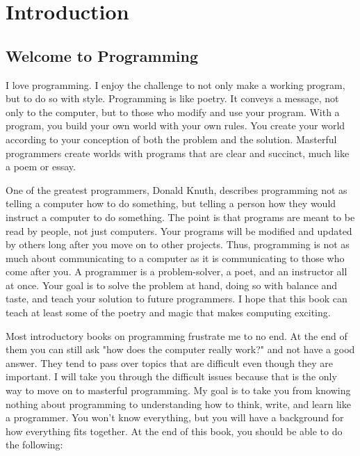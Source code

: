 \chapter{Introduction}

% 
% 
% 
% 

\section{Welcome to Programming}

I love
programming.  I
enjoy the challenge to not only make a working program, but to do so
with style.  Programming is like poetry.  It conveys a message, not
only to the computer, but to those who modify and use your program.
With a program, you build your own world with your own rules.  You
create your world according to your conception of both the problem and
the solution.  Masterful programmers create worlds with programs that
are clear and succinct, much like a poem or essay.

One of the greatest programmers, Donald Knuth, 
describes programming not as telling a computer how to do something,
but telling a person how they would instruct a computer to do something.
The point is that programs are meant to be read by people, not
just computers.  Your programs will be modified and updated by others
long after you move on to other projects.  Thus, programming is not
as much about communicating to a computer as it is communicating to
those who come after you.  A programmer is a problem-solver, a poet, and an
instructor all at once.  Your goal is to solve the problem at hand,
doing so with balance and taste, and teach your solution to
future programmers.  I hope that this book can teach at least some
of the poetry and magic that makes computing exciting.

 

Most introductory books on programming frustrate me to no end.  At the
end of them you can still ask "how does the computer really work?" and
not have a good answer.  They tend to pass over topics that are 
difficult even though they are important.  I will take you through
the difficult issues because that is the only way to move on to
masterful programming.  My goal is to take you from knowing nothing about
programming to understanding how to think, write, and learn like
a programmer.  You won't know everything, but you will have a background
for how everything fits together.  At the end of this book, you should 
be able to do the following:

